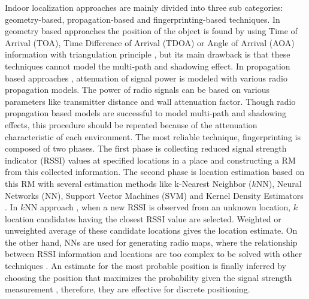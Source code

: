 \documentclass{article}
\begin{document}
	Indoor localization approaches are mainly divided into three sub categories: geometry-based, propagation-based and fingerprinting-based techniques. In geometry based approaches the position of the object is found by using Time of Arrival (TOA), Time Difference of Arrival (TDOA) or Angle of Arrival (AOA) information with triangulation principle \cite{Fan1990,Pet1998}, but its main drawback is that these techniques cannot model the multi-path and shadowing effect. In propagation based approaches \cite{bah2000}, attenuation of signal power is modeled with various radio propagation models. The power of radio signals can be based on various parameters like transmitter distance and wall attenuation factor. Though radio propagation based models are successful to model multi-path and shadowing effects, this procedure should be repeated because of the attenuation characteristic of each environment. The most reliable technique, fingerprinting is composed of two phases. The first phase is collecting reduced signal strength indicator (RSSI) values at specified locations in a place and constructing a RM from this collected information. The second phase is location estimation based on this RM with several estimation methods like k-Nearest Neighbor ($k$NN), Neural Networks (NN), Support Vector Machines (SVM) and Kernel Density Estimators \cite{Roo2002}. In $k$NN approach \cite{bah2000,Big2017}, when a new RSSI is observed from an unknown location, $k$ location candidates having the closest RSSI value are selected. Weighted or unweighted average of these candidate locations gives the location estimate. On the other hand, NNs are used for generating radio maps, where the relationship between RSSI information and locations are too complex to be solved with other techniques \cite{Lyu2011,Maz2015,Sol2016,Zho2017}. An estimate for the most probable position is finally inferred by choosing the position that maximizes the probability given the signal strength measurement \cite{Fas2016}, therefore, they are effective for discrete positioning. 
	
\end{document}
